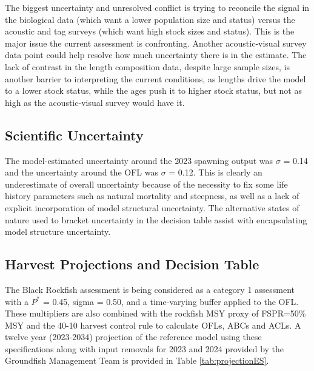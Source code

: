 \documentclass[11pt,
  letterpaper,
]{article}
\begin{document}
The biggest uncertainty and unresolved conflict is trying to reconcile the signal in the biological data (which want a lower population size and status) versus the acoustic and tag surveys (which want high stock sizes and status). This is the major issue the current assessment is confronting. Another acoustic-visual survey data point could help resolve how much uncertainty there is in the estimate. The lack of contrast in the length composition data, despite large sample sizes, is another barrier to interpreting the current conditions, as lengths drive the model to a lower stock status, while the ages push it to higher stock status, but not as high as the acoustic-visual survey would have it.

\hypertarget{scientific-uncertainty}{%
\subsection*{Scientific Uncertainty}\label{scientific-uncertainty}}

The model-estimated uncertainty around the 2023 spawning output was \(\sigma\) = 0.14 and the uncertainty around the OFL was \(\sigma\) = 0.12. This is clearly an underestimate of overall uncertainty because of the necessity to fix some life history parameters such as natural mortality and steepness, as well as a lack of explicit incorporation of model structural uncertainty. The alternative states of nature used to bracket uncertainty in the decision table assist with encapsulating model structure uncertainty.

\hypertarget{harvest-projections-and-decision-table}{%
\subsection*{Harvest Projections and Decision Table}\label{harvest-projections-and-decision-table}}

The Black Rockfish assessment is being considered as a category 1 assessment with a \(P^*\) = 0.45, sigma = 0.50, and a time-varying buffer applied to the OFL. These multipliers are also combined with the rockfish MSY proxy of FSPR=50\% MSY and the 40-10 harvest control rule to calculate OFLs, ABCs and ACLs. A twelve year (2023-2034) projection of the reference model using these specifications along with input removals for 2023 and 2024 provided by the Groundfish Management Team is provided in Table \ref{tab:projectionES}.
\end{document}
